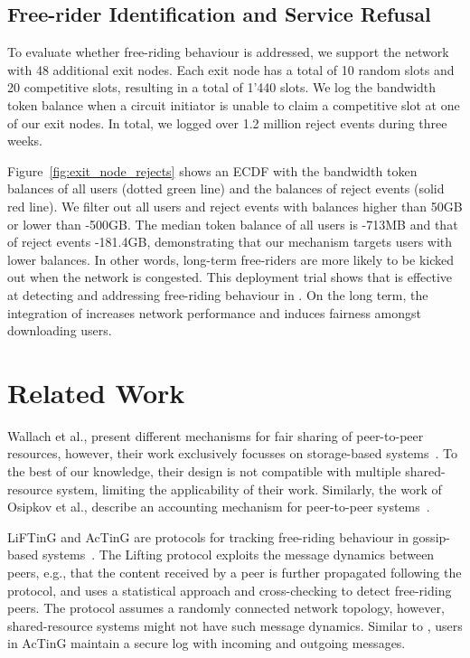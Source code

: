\subsection{Free-rider Identification and Service Refusal}
To evaluate whether free-riding behaviour is addressed, we support the \Tribler{} network with 48 additional exit nodes.
Each exit node has a total of 10 random slots and 20 competitive slots, resulting in a total of 1'440 slots.
We log the bandwidth token balance when a circuit initiator is unable to claim a competitive slot at one of our exit nodes.
In total, we logged over 1.2 million reject events during three weeks.

Figure~\ref{fig:exit_node_rejects} shows an ECDF with the bandwidth token balances of all users (dotted green line) and the balances of reject events (solid red line).
We filter out all users and reject events with balances higher than 50GB or lower than -500GB.
The median token balance of all users is -713MB and that of reject events -181.4GB, demonstrating that our mechanism targets users with lower balances.
In other words, long-term free-riders are more likely to be kicked out when the network is congested.
This deployment trial shows that \ModelName{} is effective at detecting and addressing free-riding behaviour in \Tribler{}.
On the long term, the integration of \ModelName{} increases network performance and induces fairness amongst downloading users.


\section{Related Work}
Wallach et al., present different mechanisms for fair sharing of peer-to-peer resources, however, their work exclusively focusses on storage-based systems~\cite{wallach2003enforcing}.
To the best of our knowledge, their design is not compatible with multiple shared-resource system, limiting the applicability of their work.
Similarly, the work of Osipkov et al., describe an accounting mechanism for peer-to-peer systems~\cite{osipkov2006robust}.

LiFTinG and AcTinG are protocols for tracking free-riding behaviour in gossip-based systems~\cite{guerraoui2010lifting,mokhtar2014acting}.
The Lifting protocol exploits the message dynamics between peers, e.g., that the content received by a peer is further propagated following the protocol, and uses a statistical approach and cross-checking to detect free-riding peers.
The protocol assumes a randomly connected network topology, however, shared-resource systems might not have such message dynamics.
Similar to \ModelName{}, users in AcTinG maintain a secure log with incoming and outgoing messages.

